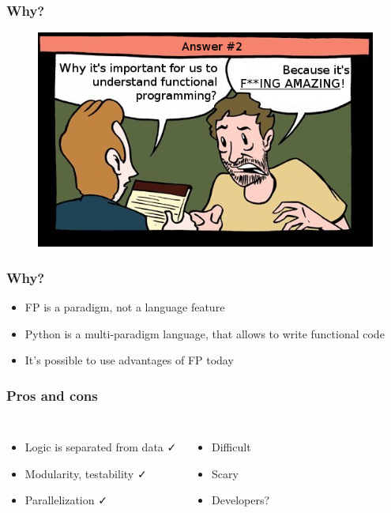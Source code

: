 \documentclass[18pt, compress]{beamer}
\def\check{\textcolor{check}{\FA \faCheck}}
\def\fail{\textcolor{fail}{\FA \faRemove}}
\begin{document}
\begin{frame}
    \frametitle{Why?}
    \vspace{-15pt}
    \begin{figure}
        \includegraphics[width=1.0\textwidth,center]{second_option.png}
    \end{figure}
\end{frame}

\begin{frame}[fragile]
    \frametitle{Why?}
    \begin{itemize}[label={\MVRightarrow}]
        \item FP is a paradigm, not a language feature
        \item Python is a multi-paradigm language, that allows to write functional code
        \item It's possible to use advantages of FP today
    \end{itemize}
\end{frame}

\fontsize{15pt}{16}\selectfont
\begin{frame}
    \frametitle{Pros and cons}
    \vspace{-20pt}
    \begin{columns}[T,onlytextwidth]
    \begin{itemize}[label={\MVRightarrow}, leftmargin=-0.05cm]
            \item <+->Logic is separated from data  \check
            \item <+->Modularity, testability \check
            \item <+->Parallelization \check
        \end{itemize}

        \begin{itemize}[label={\MVRightarrow}]
            \item <+->Difficult \fail
            \item <+->Scary \fail
            \item <+->Developers? \fail
        \end{itemize}
    \end{columns}
\end{frame}
\fontsize{17pt}{18}\selectfont
\end{document}
